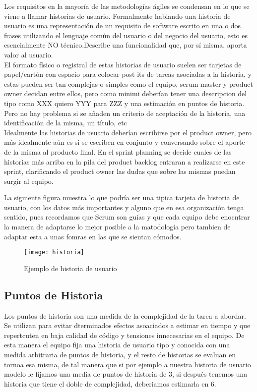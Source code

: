 \documentclass[../pfc.tex]{subfiles}
\begin{document}
	Los requisitos en la mayoría de las metodologías ágiles se condensan en lo que se viene a llamar historias de usuario. Formalmente hablando una historia de usuario es una representación de un requisito de software escrito en una o dos frases utilizando el lenguaje común del usuario o del negocio del usuario, esto es esencialmente NO técnico.Describe una funcionalidad que, por sí misma, aporta valor al usuario.\\
	
	El formato físico o registral de estas historias de usuario suelen ser tarjetas de papel/cartón con espacio para colocar post its de tareas asociadas a la historia, y estas pueden ser tan complejas o simples como el equipo, scrum master y product owner decidan entre ellos, pero como minimi deberían tener una descripcion del tipo como XXX quiero YYY para ZZZ y una estimación en puntos de historia. Pero no hay problema si se añaden un criterio de aceptación de la historia, una identificación de la misma, un título, etc\\
	
	Idealmente las historias de usuario deberían escribirse por el product owner, pero más idealmente aún es si se escriben en conjunto y conversando sobre el aporte de la misma al producto final. En el sprint planning se decide cuales de las historias más arriba en la pila del product backlog entraran a realizarse en este sprint, clarificando el product owner las dudas que sobre las mismas puedan surgir al equipo.
	
	La siguiente figura muestra lo que podría ser una tipica tarjeta de historia de usuario, con los datos más importantes y alguno que en esa organización tenga sentido, pues recordamos que Scrum son guías y que cada equipo debe enocntrar la manera de adaptarse lo mejor posible a la matodología pero tambien de adaptar esta a unas fomras en las que se sientan cómodos. \\ 
	
	\begin{figure}[h]
		\centering
		\texttt{[image: historia]}
		\caption{Ejemplo de historia de usuario}
		\label{fig:ejemplo de historia de usuario}
	\end{figure}
	
	\subsection{Puntos de Historia}
	
	Los puntos de historia son una medida de la complejidad de la tarea a abordar. Se utilizan para evitar dterminados efectos asoaciados a estimar en tiempo y que repertcuten en baja calidad de código y tensiones innecesarias en el equipo. De esta manera el equipo fija una historia de usuario tipo y conocida con una medida arbitraria de puntos de historia, y el resto de historias se evaluan en tornoa esa misma, de tal manera que si por ejemplo a nuestra historia de usuario modelo le fijamos una media de puntos de historia de 3, si después tenemos una historia que tiene el doble de complejidad, deberiamos estimarla en 6.\\
	
\end{document}
